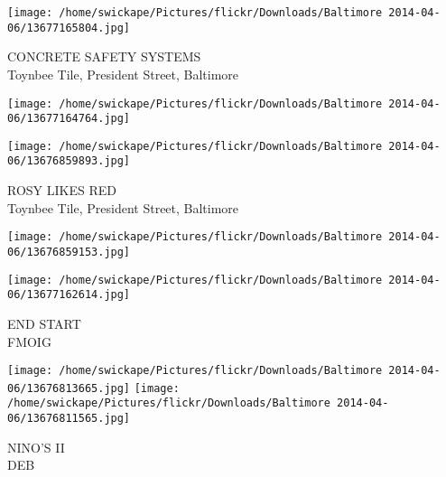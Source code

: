 \documentclass[10pt,letterpaper]{article}
\begin{document}
\vspace{0.25in}
\texttt{[image: /home/swickape/Pictures/flickr/Downloads/Baltimore 2014-04-06/13677165804.jpg]}

CONCRETE SAFETY SYSTEMS\\
Toynbee Tile, President Street, Baltimore
\pagebreak

\texttt{[image: /home/swickape/Pictures/flickr/Downloads/Baltimore 2014-04-06/13677164764.jpg]}

\vspace{0.25in}
\texttt{[image: /home/swickape/Pictures/flickr/Downloads/Baltimore 2014-04-06/13676859893.jpg]}

ROSY LIKES RED\\
Toynbee Tile, President Street, Baltimore
\pagebreak

\texttt{[image: /home/swickape/Pictures/flickr/Downloads/Baltimore 2014-04-06/13676859153.jpg]}

\vspace{0.25in}
\texttt{[image: /home/swickape/Pictures/flickr/Downloads/Baltimore 2014-04-06/13677162614.jpg]}

END START\\
FMOIG
\pagebreak

\texttt{[image: /home/swickape/Pictures/flickr/Downloads/Baltimore 2014-04-06/13676813665.jpg]}
\texttt{[image: /home/swickape/Pictures/flickr/Downloads/Baltimore 2014-04-06/13676811565.jpg]}

NINO'S II\\
DEB
\pagebreak
\end{document}

